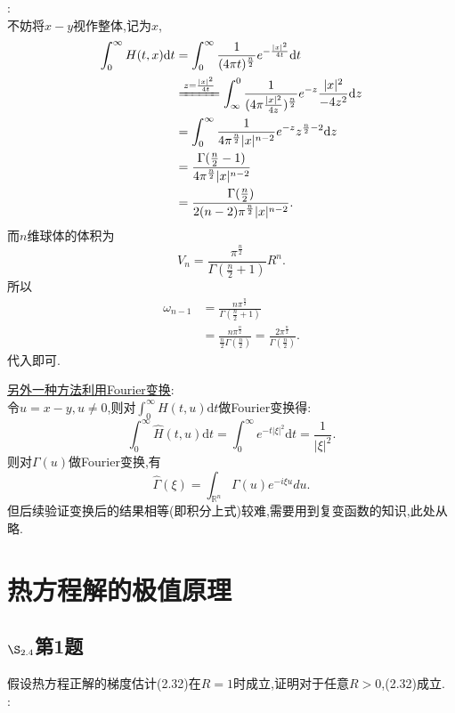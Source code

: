 \documentclass[12pt, a4paper]{ctexbook}
\newcommand{\dz}{\text{d}z}
\newcommand{\dt}{\text{d}t}
\newcommand{\cosy}{\xi}%
\begin{document}
    \songti{}:\\
    
    不妨将$x-y$视作整体,记为$x$,
    \begin{align*}
    \int_0^{\infty}H(t,x)\dt &=\int_0^{\infty}\frac{1}{(4\pi t)^{\frac{n}{2}}}e^{-\frac{|x|^2}{4t}}\dt\\
    &\xlongequal{z = \frac{|x|^2}{4t}}\int_{\infty}^0 \frac{1}{(4\pi \frac{|x|^2}{4z})^{\frac{n}{2}}} e^{-z} \frac{|x|^2}{-4z^2}\dz\\
    &=\int_0^{\infty} \frac{1}{4\pi^{\frac{n}{2}}|x|^{n-2}}e^{-z} z^{\frac{n}{2}-2}\dz\\
    &=\frac{\Gamma(\frac{n}{2}-1)}{4\pi^{\frac{n}{2}}|x|^{n-2}}\\
    &=\frac{\Gamma(\frac{n}{2})}{2(n-2)\pi^{\frac{n}{2}}|x|^{n-2}}.
    \end{align*}
    而$n$维球体的体积为
    \begin{equation*}
    V_n = \frac{\pi^{\frac{n}{2}}}{\Gamma(\frac{n}{2}+1)}R^n.
    \end{equation*}
    所以
    \begin{align*}
    \omega_{n-1}&= \frac{n\pi^{\frac{n}{2}}}{\Gamma(\frac{n}{2}+1)}\\
    &=\frac{n\pi^{\frac{n}{2}}}{\frac{n}{2}\Gamma(\frac{n}{2})}
    =\frac{2\pi^{\frac{n}{2}}}{\Gamma(\frac{n}{2})}.
    \end{align*}
    代入即可.
    
    \uline{另外一种方法利用Fourier变换}:\\
    
    令$u=x-y, u\neq0$,则对$\int_0^\infty H(t, u)\dt$做Fourier变换得:
    $$\int_0^\infty \widehat H(t, u)\dt = \int_0^\infty e^{-t|\cosy|^2} \dt = \frac1{|\cosy|^2}.$$
    则对$\Gamma(u)$做Fourier变换,有$$\widehat{\Gamma}(\cosy) = \int_{\mathbb R^n}\Gamma(u)e^{-i\cosy u}du.$$
    但后续验证变换后的结果相等(即积分上式)较难,需要用到复变函数的知识,此处从略.
    
    \section{热方程解的极值原理}
    \subsection{$\S_{2.4}$第1题}
    \kaishu{}假设热方程正解的梯度估计(2.32)在$R=1$时成立,证明对于任意$R>0$,(2.32)成立. \\
    
    \songti{}:\\
    
\end{document}
